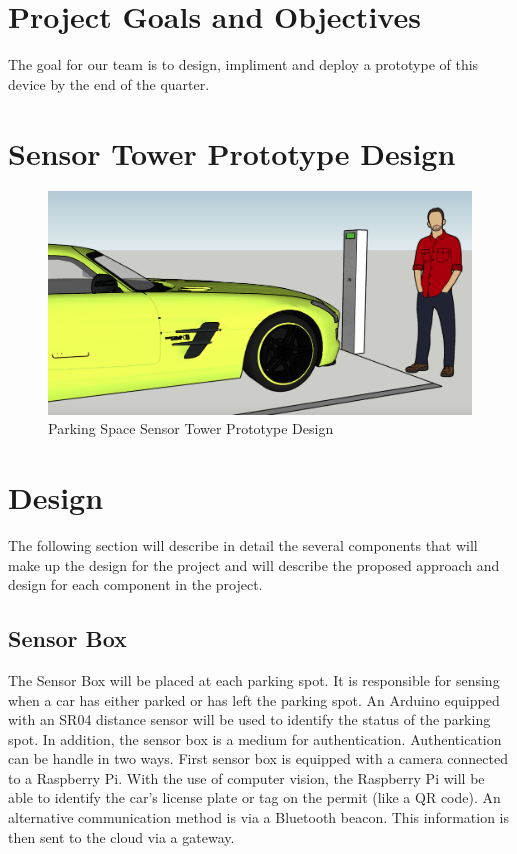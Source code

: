 \documentclass[paper=a4, fontsize=12pt]{scrartcl}
\numberwithin{equation}{section}		%
\numberwithin{figure}{section}			%
\numberwithin{table}{section}				%
\begin{document}
\section{Project Goals and Objectives}
The goal for our team is to design, impliment and deploy a prototype of this device by the end of the quarter.

\section{Sensor Tower Prototype Design}
\begin{center}
\begin{figure}[H]
\centering
\hbox{\hspace{-1.65cm}\includegraphics[width=7.5in]{Prototype_Image.png}}
\caption{Parking Space Sensor Tower Prototype Design}
\end{figure}
\end{center}

\section{Design}
The following section will describe in detail the several components that will make up the design for the project and will describe the proposed approach and design for each component in the project.


\subsection{Sensor Box} 
The Sensor Box will be placed at each parking spot. It is responsible for sensing when a car has either parked or has left the parking spot. An Arduino equipped with an SR04 distance sensor will be used to identify the status of the parking spot. In addition, the sensor box is a medium for authentication. Authentication can be handle in two ways. First sensor box is equipped with a camera connected to a Raspberry Pi. With the use of computer vision, the Raspberry Pi will be able to identify the car's license plate or tag on the permit (like a QR code). An alternative communication method is via a Bluetooth beacon. This information is then sent to the cloud via a gateway.
\end{document}
